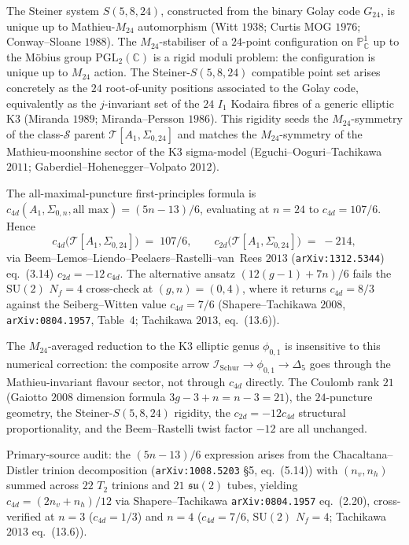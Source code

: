 \begin{proposition}
\label{prop:k3-steiner-rigidity}
The Steiner system $S(5,8,24)$, constructed from the binary Golay code $G_{24}$, is unique up to Mathieu-$M_{24}$ automorphism (Witt $1938$; Curtis MOG $1976$; Conway--Sloane $1988$). The $M_{24}$-stabiliser of a $24$-point configuration on $\mathbb{P}^1_{\mathbb{C}}$ up to the M\"obius group $\mathrm{PGL}_2(\mathbb{C})$ is a rigid moduli problem: the configuration is unique up to $M_{24}$ action. The Steiner-$S(5,8,24)$ compatible point set arises concretely as the $24$ root-of-unity positions associated to the Golay code, equivalently as the $j$-invariant set of the $24$ $I_1$ Kodaira fibres of a generic elliptic K3 (Miranda $1989$; Miranda--Persson $1986$). This rigidity seeds the $M_{24}$-symmetry of the class-$\mathcal{S}$ parent $\mathcal{T}[A_1,\Sigma_{0,24}]$ and matches the $M_{24}$-symmetry of the Mathieu-moonshine sector of the K3 sigma-model (Eguchi--Ooguri--Tachikawa $2011$; Gaberdiel--Hohenegger--Volpato $2012$).
\end{proposition}

\begin{remark}
\label{rem:k3-classS-numerical-caveat}
The all-maximal-puncture first-principles formula is
$c_{4d}(A_1, \Sigma_{0,n}, \text{all max}) = (5n - 13)/6$, evaluating
at $n = 24$ to $c_{4d} = 107/6$. Hence
\[
 c_{4d}\bigl(\mathcal{T}[A_1, \Sigma_{0,24}]\bigr) \;=\; 107/6,
 \qquad
 c_{2d}\bigl(\mathcal{T}[A_1, \Sigma_{0,24}]\bigr) \;=\; -214,
\]
via Beem--Lemos--Liendo--Peelaers--Rastelli--van~Rees $2013$
(\texttt{arXiv:1312.5344}) eq.~(3.14) $c_{2d} = -12\, c_{4d}$.
The alternative ansatz $(12(g-1) + 7n)/6$ fails the
$\mathrm{SU}(2)$ $N_f = 4$ cross-check at $(g,n)=(0,4)$, where it
returns $c_{4d} = 8/3$ against the Seiberg--Witten value
$c_{4d} = 7/6$ (Shapere--Tachikawa $2008$,
\texttt{arXiv:0804.1957}, Table~4; Tachikawa $2013$, eq.~(13.6)).

The $M_{24}$-averaged reduction to the K3 elliptic genus
$\phi_{0,1}$ is insensitive to this numerical correction: the
composite arrow
$\mathcal{I}_{\mathrm{Schur}} \to \phi_{0,1} \to \Delta_5$ goes
through the Mathieu-invariant flavour sector, not through $c_{4d}$
directly. The Coulomb rank $21$ (Gaiotto $2008$ dimension formula
$3g - 3 + n = n - 3 = 21$), the $24$-puncture geometry, the
Steiner-$S(5,8,24)$ rigidity, the $c_{2d} = -12 c_{4d}$ structural
proportionality, and the Beem--Rastelli twist factor $-12$ are all
unchanged.

Primary-source audit: the $(5n - 13)/6$ expression arises from the
Chacaltana--Distler trinion decomposition (\texttt{arXiv:1008.5203}
\S5, eq.~(5.14)) with $(n_v, n_h)$ summed across $22$ $T_2$ trinions
and $21$ $\mathfrak{su}(2)$ tubes, yielding $c_{4d} = (2 n_v + n_h)/12$
via Shapere--Tachikawa \texttt{arXiv:0804.1957} eq.~(2.20), cross-verified
at $n = 3$ ($c_{4d} = 1/3$) and $n = 4$ ($c_{4d} = 7/6$,
$\mathrm{SU}(2)$ $N_f = 4$; Tachikawa $2013$ eq.~(13.6)).
\end{remark}

